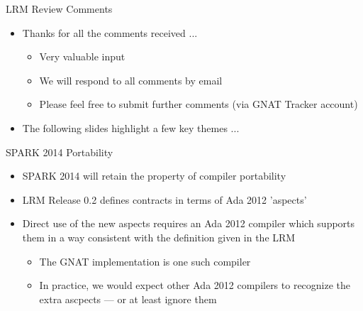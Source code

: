 \documentclass{beamer}
\begin{document}
\begin{frame}{LRM Review Comments}

  \begin{itemize}

  \item Thanks for all the comments received ...

    \begin{itemize}
    \item Very valuable input
    \item We will respond to all comments by email
    \item Please feel free to submit further comments (via GNAT Tracker account)
    \end{itemize}

  \item The following slides highlight a few key themes ...

  \end{itemize}

\end{frame}

\begin{frame}{SPARK 2014 Portability}

  \begin{itemize}
  \item SPARK 2014 will retain the property of compiler portability

  \item LRM Release 0.2 defines contracts in terms of Ada 2012 'aspects'

  \item Direct use of the new aspects requires an Ada 2012 compiler which supports them in a way consistent with the definition given in the LRM

    \begin{itemize}
    \item The GNAT implementation is one such compiler
    \item In practice, we would expect other Ada 2012 compilers to recognize the extra ascpects --- or at least ignore them
    \end{itemize}

\end{itemize}

\end{frame}
\end{document}
